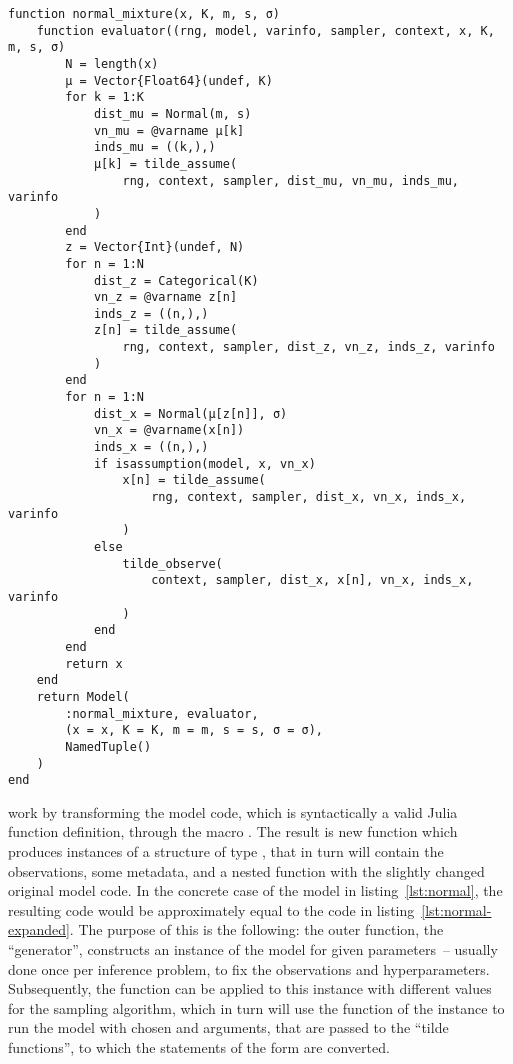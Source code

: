 \begin{lstlisting}[float=p, caption={Expansion of model~\ref{lst:normal}.}, label={lst:normal-expanded}]
function normal_mixture(x, K, m, s, σ)
    function evaluator((rng, model, varinfo, sampler, context, x, K, m, s, σ)
        N = length(x)
        μ = Vector{Float64}(undef, K)
        for k = 1:K
            dist_mu = Normal(m, s)
            vn_mu = @varname μ[k]
            inds_mu = ((k,),)
            μ[k] = tilde_assume(
                rng, context, sampler, dist_mu, vn_mu, inds_mu, varinfo
            )
        end
        z = Vector{Int}(undef, N)
        for n = 1:N
            dist_z = Categorical(K)
            vn_z = @varname z[n]
            inds_z = ((n,),)
            z[n] = tilde_assume(
                rng, context, sampler, dist_z, vn_z, inds_z, varinfo
            )
        end
        for n = 1:N
            dist_x = Normal(μ[z[n]], σ)
            vn_x = @varname(x[n])
            inds_x = ((n,),)
            if isassumption(model, x, vn_x)
                x[n] = tilde_assume(
                    rng, context, sampler, dist_x, vn_x, inds_x, varinfo
                )
            else
                tilde_observe(
                    context, sampler, dist_x, x[n], vn_x, inds_x, varinfo
                )
            end
        end
        return x
    end
    return Model(
        :normal_mixture, evaluator, 
        (x = x, K = K, m = m, s = s, σ = σ), 
        NamedTuple()
    )
end
\end{lstlisting}

 work by transforming the model code, which is syntactically a
valid Julia function definition, through the macro . The result
is new function which produces instances of a structure of type , that in turn will
contain the observations, some metadata, and a nested function with the slightly changed original
model code. In the concrete case of the model in listing~\ref{lst:normal}, the resulting code would
be approximately equal to the code in listing~\ref{lst:normal-expanded}.  The purpose of this is the
following: the outer function, the \enquote{generator}, constructs an instance of the model for
given parameters~-- usually done once per inference problem, to fix the observations and
hyperparameters.  Subsequently, the  function can be applied to this instance with
different values for the sampling algorithm, which in turn will use the  function
of the instance to run the model with chosen  and  arguments, that are
passed to the \enquote{tilde functions}, to which the statements of the form  are
converted.

